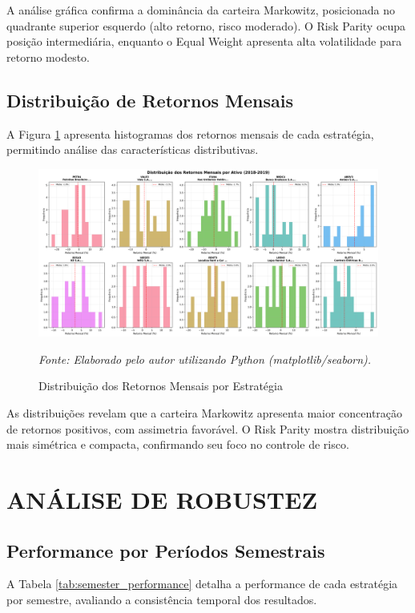 A análise gráfica confirma a dominância da carteira Markowitz, posicionada no quadrante superior esquerdo (alto retorno, risco moderado). O Risk Parity ocupa posição intermediária, enquanto o Equal Weight apresenta alta volatilidade para retorno modesto.

\subsection{Distribuição de Retornos Mensais}

A Figura \ref{fig:returns_distribution} apresenta histogramas dos retornos mensais de cada estratégia, permitindo análise das características distributivas.

\begin{figure}[H]
\centering
\includegraphics[width=\textwidth]{images/returns_distribution.png}
\caption{Distribuição dos Retornos Mensais por Estratégia}
\textit{Fonte: Elaborado pelo autor utilizando Python (matplotlib/seaborn).}
\label{fig:returns_distribution}
\end{figure}

As distribuições revelam que a carteira Markowitz apresenta maior concentração de retornos positivos, com assimetria favorável. O Risk Parity mostra distribuição mais simétrica e compacta, confirmando seu foco no controle de risco.

\section{ANÁLISE DE ROBUSTEZ}

\subsection{Performance por Períodos Semestrais}

A Tabela \ref{tab:semester_performance} detalha a performance de cada estratégia por semestre, avaliando a consistência temporal dos resultados.

